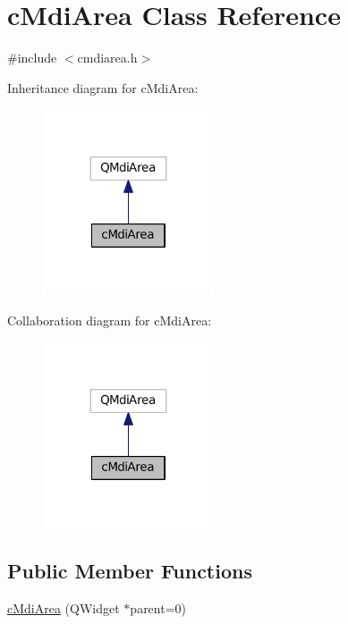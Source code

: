 \hypertarget{classc_mdi_area}{}\section{c\+Mdi\+Area Class Reference}
\label{classc_mdi_area}


{\ttfamily \#include $<$cmdiarea.\+h$>$}



Inheritance diagram for c\+Mdi\+Area\+:
\nopagebreak
\begin{figure}[H]
\begin{center}
\leavevmode
\includegraphics[width=143pt]{classc_mdi_area__inherit__graph}
\end{center}
\end{figure}


Collaboration diagram for c\+Mdi\+Area\+:
\nopagebreak
\begin{figure}[H]
\begin{center}
\leavevmode
\includegraphics[width=143pt]{classc_mdi_area__coll__graph}
\end{center}
\end{figure}
\subsection*{Public Member Functions}
\begin{DoxyCompactItemize}
\item 
\hyperlink{classc_mdi_area_a8638403fcff001f5f707c610ed391525}{c\+Mdi\+Area} (Q\+Widget $\ast$parent=0)
\end{DoxyCompactItemize}
